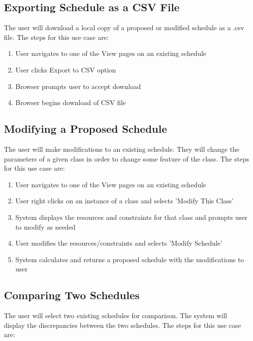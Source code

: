 \documentclass{extarticle}
\begin{document}
\subsection{Exporting Schedule as a CSV File}
The user will download a local copy of a proposed or modified schedule as a .csv file.  The steps for this use
case are:

\begin{enumerate}
\item User navigates to one of the View pages on an existing schedule
\item User clicks Export to CSV option
\item Browser prompts user to accept download
\item Browser begins download of CSV file
\end{enumerate}


\subsection{Modifying a Proposed Schedule}
The user will make modifications to an existing schedule.  They will change the parameters of a given class in
order to change some feature of the class.  The steps for this use case are:

\begin{enumerate}
\item User navigates to one of the View pages on an existing schedule
\item User right clicks on an instance of a class and selects 'Modify This Class'
\item System displays the resources and constraints for that class and prompts user to modify as needed
\item User modifies the resources/constraints and selects 'Modify Schedule'
\item System calculates and returns a proposed schedule with the modifications to user
\end{enumerate}


\subsection{Comparing Two Schedules}
The user will select two existing schedules for comparison.  The system will display the discrepancies between the
two schedules.  The steps for this use case are:
\end{document}
